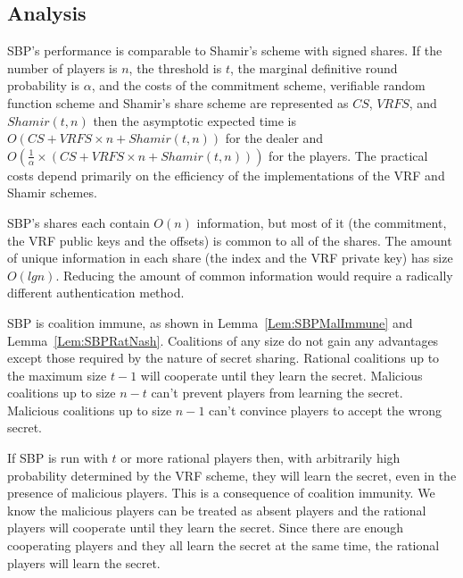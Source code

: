 \documentclass{dalcsthesis}
\begin{document}
\subsection{Analysis}

SBP's performance is comparable to Shamir's scheme with signed shares. If the number of players is $n$, the threshold is $t$, the marginal definitive round probability is $\alpha$, and the costs of the commitment scheme, verifiable random function scheme and Shamir's share scheme are represented as $CS$, $VRFS$, and $Shamir(t, n)$ then the asymptotic expected time is $O(CS + VRFS \times n + Shamir(t, n))$ for the dealer and $O(\frac{1}{\alpha} \times (CS + VRFS \times n + Shamir(t, n)))$ for the players. The practical costs depend primarily on the efficiency of the implementations of the VRF and Shamir schemes.

SBP's shares each contain $O(n)$ information, but most of it (the commitment, the VRF public keys and the offsets) is common to all of the shares. The amount of unique information in each share (the index and the VRF private key) has size $O(lg n)$. Reducing the amount of common information would require a radically different authentication method.

SBP is coalition immune, as shown in Lemma~\ref{Lem:SBPMalImmune} and Lemma~\ref{Lem:SBPRatNash}. Coalitions of any size do not gain any advantages except those required by the nature of secret sharing. Rational coalitions up to the maximum size $t-1$ will cooperate until they learn the secret. Malicious coalitions up to size $n-t$ can't prevent players from learning the secret. Malicious coalitions up to size $n-1$ can't convince players to accept the wrong secret.

If SBP is run with $t$ or more rational players then, with arbitrarily high probability determined by the VRF scheme, they will learn the secret, even in the presence of malicious players. This is a consequence of coalition immunity. We know the malicious players can be treated as absent players and the rational players will cooperate until they learn the secret. Since there are enough cooperating players and they all learn the secret at the same time, the rational players will learn the secret.
\end{document}
